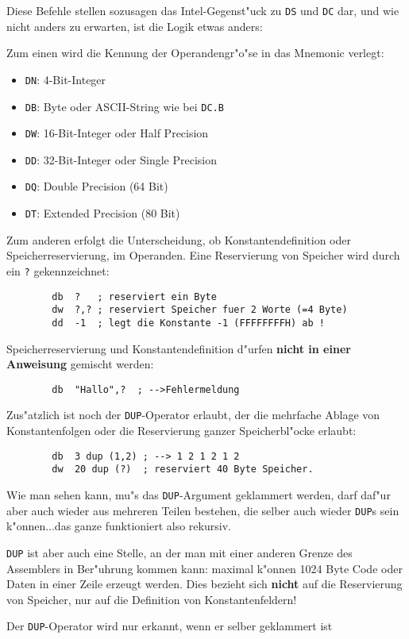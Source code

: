 \documentclass[12pt,a4paper,twoside]{report}
\makeatletter
\newcommand{\bb}[1]{{\bf #1}}
\newcommand{\tty}[1]{{\tt #1}}
\newcommand{\ttindex}[1]{\index{#1@{\tt #1}}}
\makeatother
\begin{document}
Diese Befehle stellen sozusagen das Intel-Gegenst"uck zu \tty{DS}
und \tty{DC} dar, und wie nicht anders zu erwarten, ist die Logik
etwas anders:
\par
Zum einen wird die Kennung der Operandengr"o"se in das Mnemonic
verlegt:
\begin{itemize}
\item{\tty{DN}: 4-Bit-Integer}
\item{\tty{DB}: Byte oder ASCII-String wie bei \tty{DC.B}}
\item{\tty{DW}: 16-Bit-Integer oder Half Precision}
\item{\tty{DD}: 32-Bit-Integer oder Single Precision}
\item{\tty{DQ}: Double Precision (64 Bit)}
\item{\tty{DT}: Extended Precision (80 Bit)}
\end{itemize}
Zum anderen erfolgt die Unterscheidung, ob Konstantendefinition oder
Speicherreservierung, im Operanden.  Eine Reservierung von Speicher
wird durch ein \tty{?} gekennzeichnet:
\begin{verbatim}
        db  ?   ; reserviert ein Byte
        dw  ?,? ; reserviert Speicher fuer 2 Worte (=4 Byte)
        dd  -1  ; legt die Konstante -1 (FFFFFFFFH) ab !
\end{verbatim}
Speicherreservierung und Konstantendefinition d"urfen \bb{nicht in einer
Anweisung} gemischt werden:
\begin{verbatim}
        db  "Hallo",?  ; -->Fehlermeldung
\end{verbatim}
\ttindex{DUP}
Zus"atzlich ist noch der \tty{DUP}-Operator erlaubt, der die mehrfache Ablage
von Konstantenfolgen oder die Reservierung ganzer Speicherbl"ocke erlaubt:
\begin{verbatim}
        db  3 dup (1,2) ; --> 1 2 1 2 1 2
        dw  20 dup (?)  ; reserviert 40 Byte Speicher.
\end{verbatim}
Wie man sehen kann, mu"s das \tty{DUP}-Argument geklammert werden, darf daf"ur
aber auch wieder aus mehreren Teilen bestehen, die selber auch wieder
\tty{DUP}s sein k"onnen...das ganze funktioniert also rekursiv.
\par
\tty{DUP} ist aber auch eine Stelle, an der man mit einer anderen Grenze des
Assemblers in Ber"uhrung kommen kann: maximal k"onnen 1024 Byte Code
oder Daten in einer Zeile erzeugt werden.  Dies bezieht sich \bb{nicht}
auf die Reservierung von Speicher, nur auf die Definition von
Konstantenfeldern!
\par
Der \tty{DUP}-Operator wird nur erkannt, wenn er selber geklammert ist
\end{document}
